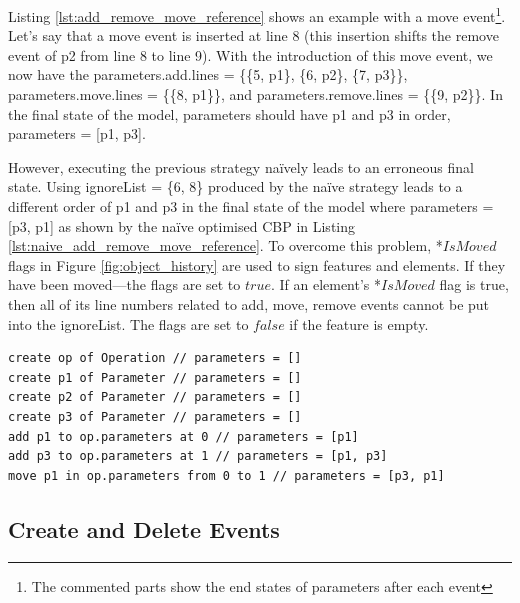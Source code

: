 Listing \ref{lst:add_remove_move_reference} shows an example with a \textsf{move} event\footnote{The commented parts show the end states of \textsf{parameters} after each event}. Let’s say that a \textsf{move} event is inserted at line 8 (this insertion shifts the \textsf{remove} event of \textsf{p2} from line 8 to line 9). With the introduction of this \textsf{move} event, we now have the \textsf{parameters}.\textsf{add}.\textsf{lines} = \{\{5, \textsf{p1}\}, \{6, \textsf{p2}\}, \{7, \textsf{p3}\}\}, \textsf{parameters}.\textsf{move}.\textsf{lines} = \{\{8, \textsf{p1}\}\}, and \textsf{parameters}.\textsf{remove}.\textsf{lines} = \{\{9, \textsf{p2}\}\}. In the final state of the model, \textsf{parameters} should have \textsf{p1} and \textsf{p3} in order, \textsf{parameters} = [p1, p3].

However, executing the previous strategy naïvely leads to an erroneous final state. Using \textsf{ignoreList} = \{6, 8\} produced by the naïve strategy leads to a different order of \textsf{p1} and \textsf{p3} in the final state of the model where \textsf{parameters} = [p3, p1] as shown by the naïve optimised CBP in Listing \ref{lst:naive_add_remove_move_reference}. To overcome this problem, *$IsMoved$ flags in Figure \ref{fig:object_history} are used to sign features and elements. If they have been moved—the flags are set to $true$. If an element’s *$IsMoved$ flag is true, then all of its line numbers related to \textsf{add}, \textsf{move}, \textsf{remove} events cannot be put into the \textsf{ignoreList}. The flags are set to $false$ if the feature is empty.
  
\vspace{-20pt}
\begin{lstlisting}[style=eol,caption={A naïve optimised CBP representation of original CBP representation in Listing \ref{lst:add_remove_move_reference}}, label=lst:naive_add_remove_move_reference]
create op of Operation // parameters = []
create p1 of Parameter // parameters = []
create p2 of Parameter // parameters = []
create p3 of Parameter // parameters = []
add p1 to op.parameters at 0 // parameters = [p1]
add p3 to op.parameters at 1 // parameters = [p1, p3]
move p1 in op.parameters from 0 to 1 // parameters = [p3, p1]
\end{lstlisting}
  
\subsection{Create and Delete Events}
\label{subsec:create_and_delete_operations}
  

